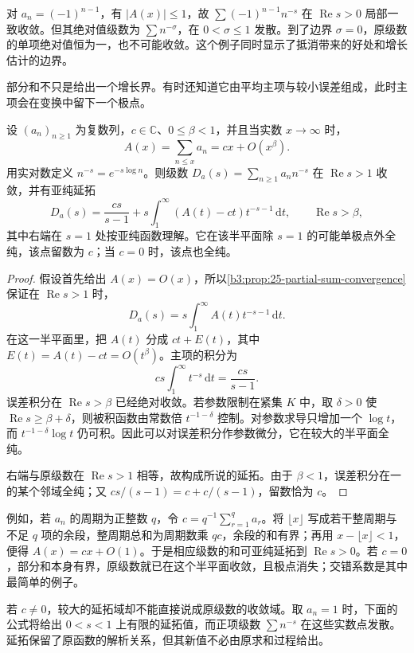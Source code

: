 对 \(a_n=(-1)^{n-1}\)，有 \(|A(x)|\le1\)，故 \(\sum(-1)^{n-1}n^{-s}\) 在 \(\operatorname{Re}s>0\) 局部一致收敛。但其绝对值级数为 \(\sum n^{-\sigma}\)，在 \(0<\sigma\le1\) 发散。到了边界 \(\sigma=0\)，原级数的单项绝对值恒为一，也不可能收敛。这个例子同时显示了抵消带来的好处和增长估计的边界。

部分和不只是给出一个增长界。有时还知道它由平均主项与较小误差组成，此时主项会在变换中留下一个极点。
\begin{proposition}[平均主项与解析奇部]\label{b3:prop:25-mean-pole}
设 \((a_n)_{n\ge1}\) 为复数列，\(c\in\mathbb C\)、\(0\le\beta<1\)，并且当实数 \(x\to\infty\) 时，
\[
 A(x)=\sum_{n\le x}a_n=cx+O(x^\beta).
\]
用实对数定义 \(n^{-s}=e^{-s\log n}\)。则级数 \(D_a(s)=\sum_{n\ge1}a_nn^{-s}\) 在 \(\operatorname{Re}s>1\) 收敛，并有亚纯延拓
\[
 D_a(s)=\frac{cs}{s-1}+s\int_1^\infty(A(t)-ct)t^{-s-1}\,\mathrm{d}t,
 \qquad \operatorname{Re}s>\beta,
\]
其中右端在 \(s=1\) 处按亚纯函数理解。它在该半平面除 \(s=1\) 的可能单极点外全纯，该点留数为 \(c\)；当 \(c=0\) 时，该点也全纯。
\end{proposition}
\begin{proof}
假设首先给出 \(A(x)=O(x)\)，所以\cref{b3:prop:25-partial-sum-convergence}保证在 \(\operatorname{Re}s>1\) 时，
\[
 D_a(s)=s\int_1^\infty A(t)t^{-s-1}\,\mathrm dt.
\]
在这一半平面里，把 \(A(t)\) 分成 \(ct+E(t)\)，其中 \(E(t)=A(t)-ct=O(t^\beta)\)。主项的积分为
\[
 cs\int_1^\infty t^{-s}\,\mathrm dt=\frac{cs}{s-1}.
\]
误差积分在 \(\operatorname{Re}s>\beta\) 已经绝对收敛。若参数限制在紧集 \(K\) 中，取 \(\delta>0\) 使 \(\operatorname{Re}s\ge\beta+\delta\)，则被积函数由常数倍 \(t^{-1-\delta}\) 控制。对参数求导只增加一个 \(\log t\)，而 \(t^{-1-\delta}\log t\) 仍可积。因此可以对误差积分作参数微分，它在较大的半平面全纯。

右端与原级数在 \(\operatorname{Re}s>1\) 相等，故构成所说的延拓。由于 \(\beta<1\)，误差积分在一的某个邻域全纯；又 \(cs/(s-1)=c+c/(s-1)\)，留数恰为 \(c\)。
\end{proof}

例如，若 \(a_n\) 的周期为正整数 \(q\)，令 \(c=q^{-1}\sum_{r=1}^q a_r\)。将 \(\lfloor x\rfloor\) 写成若干整周期与不足 \(q\) 项的余段，整周期总和为周期数乘 \(qc\)，余段的和有界；再用 \(x-\lfloor x\rfloor<1\)，便得 \(A(x)=cx+O(1)\)。于是相应级数的和可亚纯延拓到 \(\operatorname{Re}s>0\)。若 \(c=0\)，部分和本身有界，原级数就已在这个半平面收敛，且极点消失；交错系数是其中最简单的例子。

若 \(c\ne0\)，较大的延拓域却不能直接说成原级数的收敛域。取 \(a_n=1\) 时，下面的公式将给出 \(0<s<1\) 上有限的延拓值，而正项级数 \(\sum n^{-s}\) 在这些实数点发散。延拓保留了原函数的解析关系，但其新值不必由原求和过程给出。

